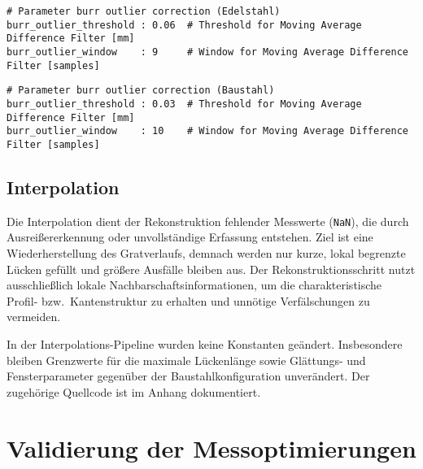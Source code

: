 \begin{lstlisting}[caption={Pipeline-Parameter Outlier Correction (Edelstahl, Burr-Kanal)}, label={lst:params-outlier-stainless}]
# Parameter burr outlier correction (Edelstahl)
burr_outlier_threshold : 0.06  # Threshold for Moving Average Difference Filter [mm]
burr_outlier_window    : 9     # Window for Moving Average Difference Filter [samples]
\end{lstlisting}

\begin{lstlisting}[caption={Pipeline-Parameter Outlier Correction (Baustahl, Burr-Kanal)}, label={lst:params-outlier-mild}]
# Parameter burr outlier correction (Baustahl)
burr_outlier_threshold : 0.03  # Threshold for Moving Average Difference Filter [mm]
burr_outlier_window    : 10    # Window for Moving Average Difference Filter [samples]
\end{lstlisting}

\subsection{Interpolation}
\label{sec:Interpolation}

Die Interpolation dient der Rekonstruktion fehlender Messwerte (\texttt{NaN}), die durch Ausreißererkennung oder unvollständige Erfassung entstehen. Ziel ist eine Wiederherstellung des Gratverlaufs, demnach werden nur kurze, lokal begrenzte Lücken gefüllt und größere Ausfälle bleiben aus. Der Rekonstruktionsschritt nutzt ausschließlich lokale Nachbarschaftsinformationen, um die charakteristische Profil- bzw.\ Kantenstruktur zu erhalten und unnötige Verfälschungen zu vermeiden.

In der Interpolations-Pipeline wurden keine Konstanten geändert. Insbesondere bleiben Grenzwerte für die maximale Lückenlänge sowie Glättungs- und Fensterparameter gegenüber der Baustahlkonfiguration unverändert. Der zugehörige Quellcode ist im Anhang dokumentiert.

\section {Validierung der Messoptimierungen}
